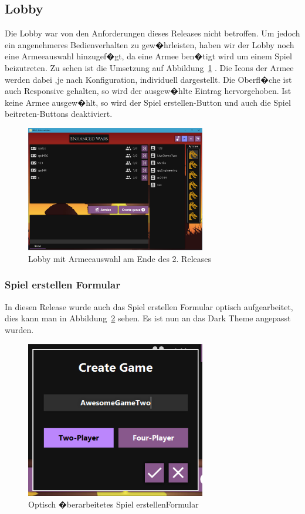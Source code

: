 \documentclass[12pt, titlepage]{scrartcl}
\newcommand{\Abb}[1]{%
	Abbildung\ \ref{#1}%
}
\begin{document}
			\subsection{Lobby}
			Die Lobby war von den Anforderungen dieses Releases nicht betroffen. Um jedoch ein angenehmeres Bedienverhalten zu gew�hrleisten, haben wir der Lobby noch eine Armeeauswahl hinzugef�gt, da eine Armee ben�tigt wird um einem Spiel beizutreten. Zu sehen ist die Umsetzung auf \Abb{LobbyFinal}. Die Icons der Armee werden dabei ,je nach Konfiguration, individuell dargestellt. Die Oberfl�che ist auch Responsive gehalten, so wird der ausgew�hlte Eintrag hervorgehoben. Ist keine Armee ausgew�hlt, so wird der \glqq Spiel erstellen\grqq-Button und auch die \glqq Spiel beitreten\grqq-Buttons deaktiviert.
			\begin{figure}[H] 
				\centering
				\includegraphics[width=0.7\textwidth]{Lobby_final.PNG}
				\caption{Lobby mit Armeeauswahl am Ende des 2. Releases}
				\label{LobbyFinal}
			\end{figure}
			
				\subsubsection{Spiel erstellen Formular}
				In diesen Release wurde auch das Spiel erstellen Formular optisch aufgearbeitet, dies kann man in \Abb{CreateGameFormularReworked} sehen. Es ist nun an das Dark Theme angepasst wurden.
				\begin{figure}[H] 
					\centering
					\includegraphics[width=0.7\textwidth]{Create_Game_final.PNG}
					\caption{Optisch �berarbeitetes \glqq Spiel erstellen\grqq Formular }
					\label{CreateGameFormularReworked}
				\end{figure}
			
\end{document}
